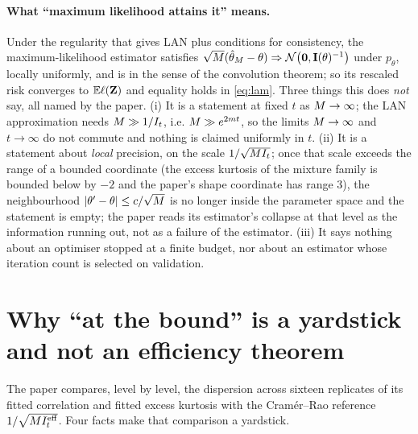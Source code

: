 \paragraph{What ``maximum likelihood attains it'' means.}
Under the regularity that gives LAN plus conditions for consistency, the
maximum-likelihood estimator satisfies $\sqrt{M}(\hat\theta_{M}-\theta)\Rightarrow\mathcal{N}\!\left(\mathbf{0},\mathbf{I}(\theta)^{-1}\right)$
under $p_\theta$, locally uniformly, and is  in the sense of the
convolution theorem; so its rescaled risk converges to $\mathbb{E}\ell(\mathbf{Z})$ and equality
holds in \cref{eq:lam}. Three things this does \emph{not} say, all named by the paper.
(i) It is a statement at fixed $t$ as $M\to\infty$; the LAN approximation needs
$M\gg1/I_t$, i.e. $M\gg e^{2mt}$, so the limits $M\to\infty$ and $t\to\infty$
do not commute and nothing is claimed uniformly in $t$. (ii) It is a statement about
\emph{local} precision, on the scale $1/\sqrt{M I_t}$; once that scale exceeds the
range of a bounded coordinate (the excess kurtosis of the mixture family is bounded
below by $-2$ and the paper's shape coordinate has range $3$), the neighbourhood
$|\theta'-\theta|\le c/\sqrt{M}$ is no longer inside the parameter space and the
statement is empty; the paper reads its estimator's collapse at that level as the
information running out, not as a failure of the estimator. (iii) It says nothing
about an optimiser stopped at a finite budget, nor about an estimator whose iteration
count is selected on validation.

\section{Why ``at the bound'' is a yardstick and not an efficiency theorem}
\label{sec:yardstick}

The paper compares, level by level, the dispersion across sixteen replicates of its
fitted correlation and fitted excess kurtosis with the Cram\'er--Rao reference
$1/\sqrt{M I^{\mathrm{eff}}_t}$. Four facts make that comparison a yardstick.

